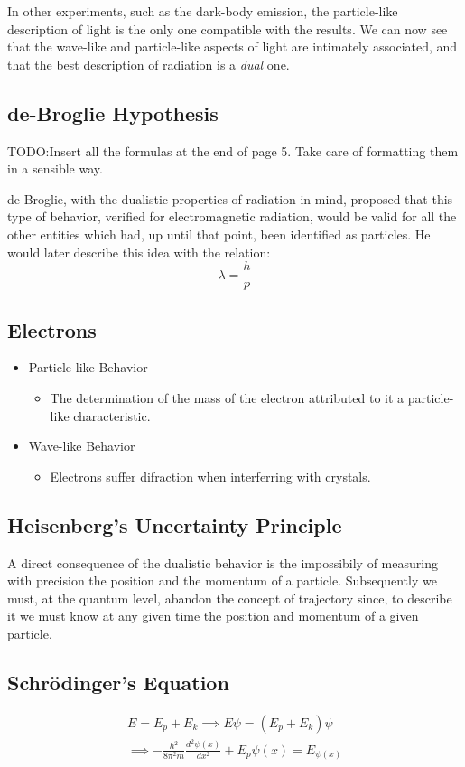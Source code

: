 \documentclass{article}[10pt]
\begin{document}
In other experiments, such as the dark-body emission, the particle-like
description of light is the only one compatible with the results. We can now see
that the wave-like and particle-like aspects of light are intimately associated,
and that the best description of radiation is a \emph{dual} one.
\subsection{de-Broglie Hypothesis}
TODO:\@ Insert all the formulas at the end of page 5. Take care of formatting
them in a sensible way.

de-Broglie, with the dualistic properties of radiation in mind,
proposed that this type of behavior, verified for electromagnetic radiation,
would be valid for all the other entities which had, up until that point, been
identified as particles. He would later describe this idea with the
relation:
$$\lambda = \frac{h}{p}$$
\subsection{Electrons}
\begin{itemize}
    \item Particle-like Behavior
          \begin{itemize}
              \item The determination of the mass of the electron attributed to
                    it a particle-like characteristic.
          \end{itemize}
    \item Wave-like Behavior
          \begin{itemize}
              \item Electrons suffer difraction when interferring with crystals.
          \end{itemize}
\end{itemize}
\subsection{Heisenberg's Uncertainty Principle}
A direct consequence of the dualistic behavior is the impossibily of measuring
with precision the position and the momentum of a particle. Subsequently we
must, at the quantum level, abandon the concept of trajectory since, to describe
it we must know at any given time the position and momentum of a given particle.
\subsection{Schrödinger's Equation}
\begin{align*}
    E = E_p + E_k \implies E\psi = (E_p + E_k)\psi \\
    \implies -\frac{h^2}{8\pi^2 m}\frac{d^2\psi(x)}{dx^2} + E_p\psi(x) = E_{\psi(x)}
\end{align*}
\end{document}
